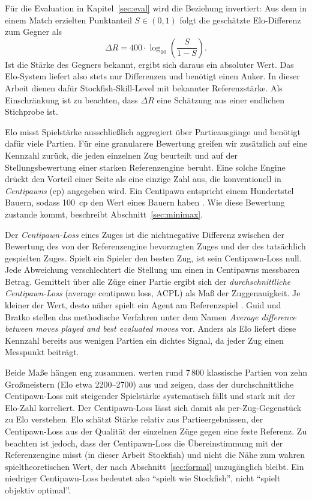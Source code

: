 \documentclass[
  a4paper, 12pt,
  parskip=half,
  headings=small,
  bibliography=totoc
]{scrartcl}
\begin{document}
Für die Evaluation in Kapitel~\ref{sec:eval} wird die Beziehung invertiert: Aus dem in einem Match erzielten Punktanteil \(S \in (0,1)\) folgt die geschätzte Elo-Differenz zum Gegner als
\[
  \Delta R = 400 \cdot \log_{10}\!\left(\frac{S}{1-S}\right).
\]
Ist die Stärke des Gegners bekannt, ergibt sich daraus ein absoluter Wert. Das Elo-System liefert also stets nur Differenzen und benötigt einen Anker. In dieser Arbeit dienen dafür Stockfish-Skill-Level mit bekannter Referenzstärke.
 Als Einschränkung ist zu beachten, dass \(\Delta R\) eine Schätzung aus einer endlichen Stichprobe ist.

Elo misst Spielstärke ausschließlich aggregiert über Partieausgänge und benötigt dafür viele Partien. Für eine granularere Bewertung greifen wir zusätzlich auf eine Kennzahl zurück, die jeden einzelnen Zug beurteilt und auf der Stellungsbewertung einer starken Referenzengine beruht. Eine solche Engine drückt den Vorteil einer Seite als eine einzige Zahl aus, die konventionell in \emph{Centipawns} (cp) angegeben wird. Ein Centipawn entspricht einem Hundertstel Bauern, sodass 100~cp den Wert eines Bauern haben \parencite{lichess_acpl}. Wie diese Bewertung zustande kommt, beschreibt Abschnitt~\ref{sec:minimax}.

Der \emph{Centipawn-Loss} eines Zuges ist die nichtnegative Differenz zwischen der Bewertung des von der Referenzengine bevorzugten Zuges und der des tatsächlich gespielten Zuges. Spielt ein Spieler den besten Zug, ist sein Centipawn-Loss null. Jede Abweichung verschlechtert die Stellung um einen in Centipawns messbaren Betrag. Gemittelt über alle Züge einer Partie ergibt sich der \emph{durchschnittliche Centipawn-Loss} (average centipawn loss, ACPL) als Maß der Zuggenauigkeit. Je kleiner der Wert, desto näher spielt ein Agent am Referenzspiel \parencite{guid2006}. Guid und Bratko \autocite{guid2006} stellen das methodische Verfahren unter dem Namen \emph{Average difference between moves played and best evaluated moves} vor. Anders als Elo liefert diese Kennzahl bereits aus wenigen Partien ein dichtes Signal, da jeder Zug einen Messpunkt beiträgt.

Beide Maße hängen eng zusammen. \textcite{leite2023} werten rund 7\,800 klassische Partien von zehn Großmeistern (Elo etwa 2200--2700) aus und zeigen, dass der durchschnittliche Centipawn-Loss mit steigender Spielstärke systematisch fällt und stark mit der Elo-Zahl korreliert. Der Centipawn-Loss lässt sich damit als per-Zug-Gegenstück zu Elo verstehen. Elo schätzt Stärke relativ aus Partieergebnissen, der Centipawn-Loss aus der Qualität der einzelnen Züge gegen eine feste Referenz.
Zu beachten ist jedoch, dass der Centipawn-Loss die Übereinstimmung mit der Referenzengine misst (in dieser Arbeit Stockfish) und nicht die Nähe zum wahren spieltheoretischen Wert, der nach Abschnitt~\ref{sec:formal} unzugänglich bleibt. Ein niedriger Centipawn-Loss bedeutet also \enquote{spielt wie Stockfish}, nicht \enquote{spielt objektiv optimal}.
\end{document}
